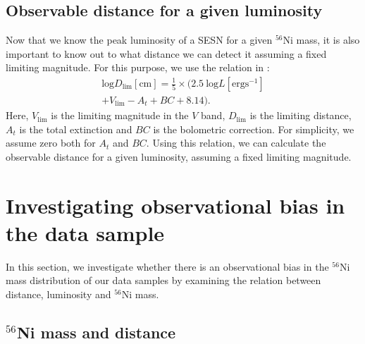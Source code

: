 \documentclass[twocolumn, linenumbers]{aastex62}
\begin{document}
\subsection{Observable distance for a given luminosity}
Now that we know the peak luminosity of a SESN for a given $^{56}$Ni mass, it is also important to know out to what distance
we can detect it assuming a fixed limiting magnitude.
For this purpose, we use the relation in \citet{2003ApJ...582..905H}:
\begin{eqnarray}
\mathrm{log} D_\mathrm{lim} [\mathrm{cm}] = \frac{1}{5} \times (2.5\ \mathrm{log} L [\mathrm{erg s}^{-1}] \nonumber  \\
+V_\mathrm{lim}-A_t+BC+8.14).
\label{d_lim_eq}
\end{eqnarray}
Here, $V_\mathrm{lim}$ is the limiting magnitude in the $V$ band, $D_\mathrm{lim}$ is the limiting distance, $A_t$ is the total extinction and $BC$ is the bolometric correction. For simplicity, we assume zero both for $A_t$ and $BC$. Using this relation, we can calculate the observable distance for a given luminosity, assuming a fixed limiting magnitude.

\section{Investigating observational bias in the data sample} \label{sec:investigate_obs_bias_from_datasample}
In this section, we investigate whether there is an observational bias in the $^{56}$Ni mass distribution of our data samples by examining the relation between distance, luminosity and $^{56}$Ni mass.

\subsection{$^{56}$Ni mass and distance} \label{sec:Ni_mass_vs_distance}
\end{document}
